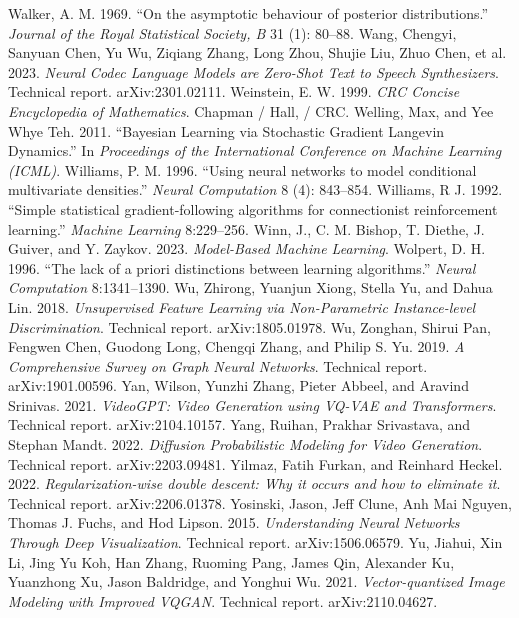  Walker, A. M. 1969. ``On the asymptotic behaviour of posterior distributions.'' \emph{Journal of the Royal Statistical Society, B} 31 (1): 80--88.
 Wang, Chengyi, Sanyuan Chen, Yu Wu, Ziqiang Zhang, Long Zhou, Shujie Liu, Zhuo Chen, et al. 2023. \emph{Neural Codec Language Models are Zero-Shot Text to Speech Synthesizers}. Technical report. arXiv:2301.02111.
 Weinstein, E. W. 1999. \emph{CRC Concise Encyclopedia of Mathematics}. Chapman / Hall, / CRC.
 Welling, Max, and Yee Whye Teh. 2011. ``Bayesian Learning via Stochastic Gradient Langevin Dynamics.'' In \emph{Proceedings of the International Conference on Machine Learning (ICML)}.
 Williams, P. M. 1996. ``Using neural networks to model conditional multivariate densities.'' \emph{Neural Computation} 8 (4): 843--854.
 Williams, R J. 1992. ``Simple statistical gradient-following algorithms for connectionist reinforcement learning.'' \emph{Machine Learning} 8:229--256.
 Winn, J., C. M. Bishop, T. Diethe, J. Guiver, and Y. Zaykov. 2023. \emph{Model-Based Machine Learning}.
 Wolpert, D. H. 1996. ``The lack of a priori distinctions between learning algorithms.'' \emph{Neural Computation} 8:1341--1390.
 Wu, Zhirong, Yuanjun Xiong, Stella Yu, and Dahua Lin. 2018. \emph{Unsupervised Feature Learning via Non-Parametric Instance-level Discrimination}. Technical report. arXiv:1805.01978.
 Wu, Zonghan, Shirui Pan, Fengwen Chen, Guodong Long, Chengqi Zhang, and Philip S. Yu. 2019. \emph{A Comprehensive Survey on Graph Neural Networks}. Technical report. arXiv:1901.00596.
 Yan, Wilson, Yunzhi Zhang, Pieter Abbeel, and Aravind Srinivas. 2021. \emph{VideoGPT: Video Generation using VQ-VAE and Transformers}. Technical report. arXiv:2104.10157.
 Yang, Ruihan, Prakhar Srivastava, and Stephan Mandt. 2022. \emph{Diffusion Probabilistic Modeling for Video Generation}. Technical report. arXiv:2203.09481.
 Yilmaz, Fatih Furkan, and Reinhard Heckel. 2022. \emph{Regularization-wise double descent: Why it occurs and how to eliminate it}. Technical report. arXiv:2206.01378.
 Yosinski, Jason, Jeff Clune, Anh Mai Nguyen, Thomas J. Fuchs, and Hod Lipson. 2015. \emph{Understanding Neural Networks Through Deep Visualization}. Technical report. arXiv:1506.06579.
 Yu, Jiahui, Xin Li, Jing Yu Koh, Han Zhang, Ruoming Pang, James Qin, Alexander Ku, Yuanzhong Xu, Jason Baldridge, and Yonghui Wu. 2021. \emph{Vector-quantized Image Modeling with Improved VQGAN}. Technical report. arXiv:2110.04627.
